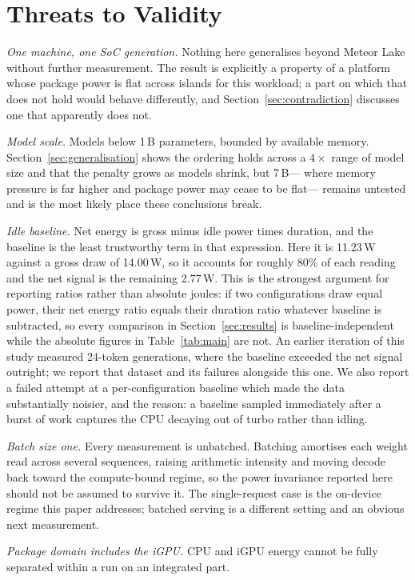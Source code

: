 \documentclass[journal]{IEEEtran}
\begin{document}
\section{Threats to Validity}
\label{sec:threats}
\emph{One machine, one SoC generation.} Nothing here generalises beyond Meteor
Lake without further measurement. The result is explicitly a property of a
platform whose package power is flat across islands for this workload; a part
on which that does not hold would behave differently, and
Section~\ref{sec:contradiction} discusses one that apparently does not.

\emph{Model scale.} Models below 1\,B parameters, bounded by available memory.
Section~\ref{sec:generalisation} shows the ordering holds across a $4\times$
range of model size and that the penalty grows as models shrink, but 7\,B---%
where memory pressure is far higher and package power may cease to be flat---%
remains untested and is the most likely place these conclusions break.

\emph{Idle baseline.} Net energy is gross minus idle power times duration, and
the baseline is the least trustworthy term in that expression. Here it is
11.23\,W against a gross draw of 14.00\,W, so it accounts for roughly 80\% of
each reading and the net signal is the remaining 2.77\,W. This is the strongest
argument for reporting ratios rather than absolute joules: if two
configurations draw equal power, their net energy ratio equals their duration
ratio whatever baseline is subtracted, so every comparison in
Section~\ref{sec:results} is baseline-independent while the absolute figures in
Table~\ref{tab:main} are not. An earlier iteration of this study measured
24-token generations, where the baseline exceeded the net signal outright; we
report that dataset and its failures alongside this one. We also report a
failed attempt at a per-configuration baseline which made the data substantially
noisier, and the reason: a baseline sampled immediately after a burst of work
captures the CPU decaying out of turbo rather than idling.

\emph{Batch size one.} Every measurement is unbatched. Batching amortises each
weight read across several sequences, raising arithmetic intensity and moving
decode back toward the compute-bound regime, so the power invariance reported
here should not be assumed to survive it. The single-request case is the
on-device regime this paper addresses; batched serving is a different setting
and an obvious next measurement.

\emph{Package domain includes the iGPU.} CPU and iGPU energy cannot be fully
separated within a run on an integrated part.
\end{document}
